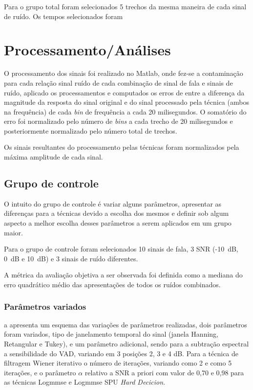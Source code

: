 

Para o grupo total foram selecionados 5 trechos da mesma maneira de cada sinal de ruído. Os tempos selecionados foram


\section{Processamento/Análises}
O processamento dos sinais foi realizado no Matlab, onde fez-se a contaminação para cada relação sinal ruído de cada combinação de sinal de fala e sinais de ruído, aplicado os processamentos e computados os erros de entre a diferença da magnitude da resposta do sinal original e do sinal processado pela técnica (ambos na frequência) de cada \textit{bin} de frequência a cada 20 milisegundos. O somatório do erro foi normalizado pelo número de \textit{bins} a cada trecho de 20 milisegundos e posteriormente normalizado pelo número total de trechos.

Os sinais resultantes do processamento pelas técnicas foram normalizados pela máxima amplitude de cada sinal.

\subsection{Grupo de controle}

O intuito do grupo de controle é variar alguns parâmetros, apresentar as diferenças para a técnicas devido a escolha dos mesmos e definir sob algum aspecto a melhor escolha desses parâmetros a serem aplicados em um grupo maior.

Para o grupo de controle foram selecionados 10 sinais de fala, 3 SNR (-10~dB, 0~dB e 10~dB) e 3 sinais de ruído diferentes.

A métrica da avaliação objetiva a ser observada foi definida como a mediana do erro quadrático médio das apresentações de todos os ruídos combinados.


\subsubsection{Parâmetros variados}
a  apresenta um esquema das variações de parâmetros realizadas, dois parâmetros foram variados, tipo de janelamento temporal do sinal (janela Hanning, Retangular e Tukey), e um parâmetro adicional, sendo para a subtração espectral a sensibilidade do VAD, variando em 3 posições 2, 3 e 4 dB. Para a técnica de filtragem Wiener iterativo o número de iterações, variando como 2 e como 5 iterações, e o parâmetro $\alpha$ relativo a SNR a priori com valor de 0,70 e 0,98 para as técnicas Logmmse e Logmmse SPU \textit{Hard Decicion}.

